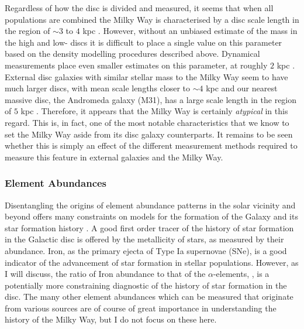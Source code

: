 Regardless of how the disc is divided and measured, it seems that when all populations are combined the Milky Way is characterised by a disc scale length in the region of $\sim 3$ to $4$ kpc \citep{2008ApJ...673..864J}. However, without an unbiased estimate of the mass in the high and low-\afe{} discs it is difficult to place a single value on this parameter based on the density modelling procedures described above. Dynamical measurements place even smaller estimates on this parameter, at roughly $2$ kpc \citep{2013ApJ...779..115B}. External disc galaxies with similar stellar mass to the Milky Way seem to have much larger discs, with mean scale lengths closer to $\sim 4$ kpc \citep[e.g.][]{2010MNRAS.406.1595F} and our nearest massive disc, the Andromeda galaxy (M31), has a large scale length in the region of $5$ kpc \citep[e.g.][]{2011ApJ...739...20C}. Therefore, it appears that the Milky Way is certainly \emph{atypical} in this regard. This is, in fact, one of the most notable characteristics that we know to set the Milky Way aside from its disc galaxy counterparts. It remains to be seen whether this is simply an effect of the different measurement methods required to measure this feature in external galaxies and the Milky Way.

\subsubsection{Element Abundances}
\label{sec:discabundances}
Disentangling the origins of element abundance patterns in the solar vicinity and beyond offers many constraints on models for the formation of the Galaxy and its star formation history \citep[seminal reviews on the goals of this effort are given by][]{1997ARA&A..35..503M,2002ARA&A..40..487F}. A good first order tracer of the history of star formation in the Galactic disc is offered by the metallicity of stars, as measured by their \feh{} abundance. Iron, as the primary ejecta of Type Ia supernovae (SNe), is a good indicator of the advancement of star formation in stellar populations. However, as I will discuss, the ratio of Iron abundance to that of the $\alpha$-elements, \afe{}, is a potentially more constraining diagnostic of the history of star formation in the disc. The many other element abundances which can be measured that originate from various sources are of course of great importance in understanding the history of the Milky Way, but I do not focus on these here.

